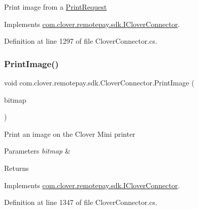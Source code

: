 Print image from a \hyperlink{classcom_1_1clover_1_1remotepay_1_1sdk_1_1_print_request}{Print\+Request} 



Implements \hyperlink{interfacecom_1_1clover_1_1remotepay_1_1sdk_1_1_i_clover_connector_a7145ff62e892d12f7461236bf67079c3}{com.\+clover.\+remotepay.\+sdk.\+I\+Clover\+Connector}.



Definition at line 1297 of file Clover\+Connector.\+cs.

\mbox{\label{classcom_1_1clover_1_1remotepay_1_1sdk_1_1_clover_connector_a4743d4155d22ddc978602814cb72ee6b}} 
\subsubsection{\texorpdfstring{Print\+Image()}{PrintImage()}}
{\footnotesize\ttfamily void com.\+clover.\+remotepay.\+sdk.\+Clover\+Connector.\+Print\+Image (\begin{DoxyParamCaption}\item[{Bitmap}]{bitmap }\end{DoxyParamCaption})}



Print an image on the Clover Mini printer 


\begin{DoxyParams}{Parameters}
{\em bitmap} & \\
\hline
\end{DoxyParams}
\begin{DoxyReturn}{Returns}

\end{DoxyReturn}


Implements \hyperlink{interfacecom_1_1clover_1_1remotepay_1_1sdk_1_1_i_clover_connector_ac716d55882598b92984159f4898bbe2a}{com.\+clover.\+remotepay.\+sdk.\+I\+Clover\+Connector}.



Definition at line 1347 of file Clover\+Connector.\+cs.

\mbox{\label{classcom_1_1clover_1_1remotepay_1_1sdk_1_1_clover_connector_a5c19ccfff8c4f7ea04c426eb11b31a6a}} 
